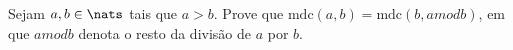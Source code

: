 \begin{exercise}
    Sejam $a, b \in \nats$ tais que $a > b$. 
    Prove que $\mathrm{mdc}(a,b) = \mathrm{mdc}(b,a \mathrel{mod} b)$, em que $a \mathrel{mod} b$ denota o resto da divisão de $a$ por $b$.
\end{exercise}